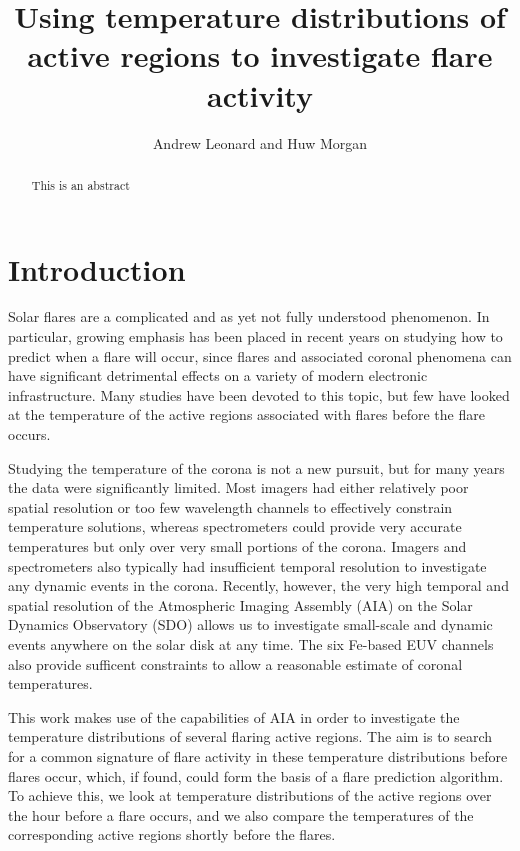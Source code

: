 \documentclass{article}
\author{Andrew Leonard and Huw Morgan}
\title{Using temperature distributions of active regions to investigate flare activity}
\begin{document}
\maketitle

\begin{abstract}
  This is an abstract
\end{abstract}

\section{Introduction}
Solar flares are a complicated and as yet not fully understood phenomenon.
In particular, growing emphasis has been placed in recent years on studying how to predict when a flare will occur, since flares and associated coronal phenomena can have significant detrimental effects on a variety of modern electronic infrastructure.
Many studies have been devoted to this topic, but few have looked at the temperature of the active regions associated with flares before the flare occurs.

Studying the temperature of the corona is not a new pursuit, but for many years the data were significantly limited.
Most imagers had either relatively poor spatial resolution or too few wavelength channels to effectively constrain temperature solutions, whereas spectrometers could provide very accurate temperatures but only over very small portions of the corona.
Imagers and spectrometers also typically had insufficient temporal resolution to investigate any dynamic events in the corona.
Recently, however, the very high temporal and spatial resolution of the Atmospheric Imaging Assembly (AIA) on the Solar Dynamics Observatory (SDO) allows us to investigate small-scale and dynamic events anywhere on the solar disk at any time.
The six Fe-based EUV channels also provide sufficent constraints to allow a reasonable estimate of coronal temperatures.

This work makes use of the capabilities of AIA in order to investigate the temperature distributions of several flaring active regions.
The aim is to search for a common signature of flare activity in these temperature distributions before flares occur, which, if found, could form the basis of a flare prediction algorithm.
To achieve this, we look at temperature distributions of the active regions over the hour before a flare occurs, and we also compare the temperatures of the corresponding active regions shortly before the flares.
\end{document}
